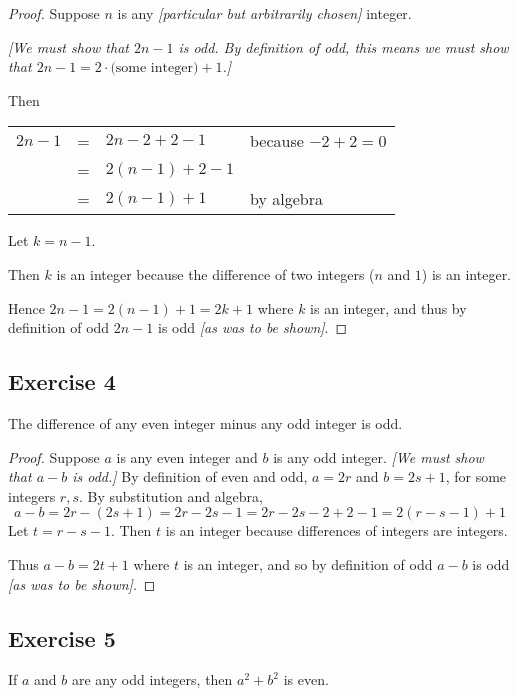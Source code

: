 \documentclass[14pt]{extarticle}
\newcommand{\cy}{\color{cyan}}
\begin{document}
\begin{proof}
    Suppose $n$ is any {\it [particular but arbitrarily chosen]} integer.

        {\it [We must show that $2n - 1$ is odd. By definition of odd, this means we must show that $2n - 1 = 2 \cdot \text{(some integer)} + 1$.]}

    Then

    \begin{center}
        \begin{tabular}{rcll}
            $2n-1$ & = & $2n - 2 + 2 - 1$ & \cy because $-2 + 2 = 0$ \\
                   & = & $2(n-1) + 2 - 1$ &                          \\
                   & = & $2(n-1) + 1$     & \cy by algebra           \\
        \end{tabular}
    \end{center}

    Let $k = n-1$.

    Then $k$ is an integer because the difference of two integers ($n$ and $1$) is an integer.

    Hence $2n-1 = 2(n-1) + 1 = 2k + 1$ where $k$ is an integer, and thus by definition of odd $2n-1$ is odd {\it [as was to be shown]}.
\end{proof}

\subsection{Exercise 4}
The difference of any even integer minus any odd integer is odd.

\begin{proof}
    Suppose $a$ is any even integer and $b$ is any odd integer.
        {\it [We must show that $a - b$ is odd.]} By definition of even and odd, $a = 2r$ and $b = 2s + 1$, for some integers $r, s$. By substitution and algebra,
    \[
        a-b = 2r - (2s+1) = 2r-2s-1 = 2r-2s-2+2-1 = 2(r-s-1)+1
    \]
    Let $t = r-s-1$. Then $t$ is an integer because differences of integers are integers.

    Thus $a-b = 2t+1$ where $t$ is an integer, and so by definition of odd $a-b$ is odd {\it [as was to be shown]}.
\end{proof}

\subsection{Exercise 5}
If $a$ and $b$ are any odd integers, then $a^2 + b^2$ is even.
\end{document}
